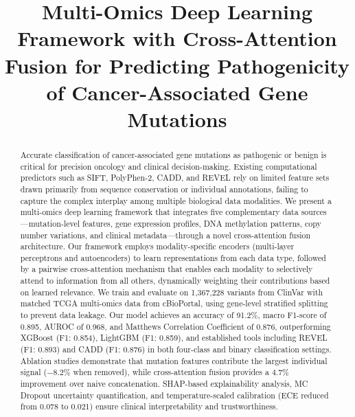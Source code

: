 \documentclass[journal,twoside]{IEEEtran}
\begin{document}
\title{Multi-Omics Deep Learning Framework with Cross-Attention Fusion
for Predicting Pathogenicity of Cancer-Associated Gene Mutations}

\author{
}

\maketitle

\begin{abstract}
Accurate classification of cancer-associated gene mutations as pathogenic or
benign is critical for precision oncology and clinical decision-making. Existing
computational predictors such as SIFT, PolyPhen-2, CADD, and REVEL rely on
limited feature sets drawn primarily from sequence conservation or individual
annotations, failing to capture the complex interplay among multiple biological
data modalities. We present a multi-omics deep learning framework that
integrates five complementary data sources---mutation-level features, gene
expression profiles, DNA methylation patterns, copy number variations, and
clinical metadata---through a novel cross-attention fusion architecture. Our
framework employs modality-specific encoders (multi-layer perceptrons and
autoencoders) to learn representations from each data type, followed by a
pairwise cross-attention mechanism that enables each modality to selectively
attend to information from all others, dynamically weighting their contributions
based on learned relevance. We train and evaluate on 1,367,228 variants from
ClinVar with matched TCGA multi-omics data from cBioPortal, using gene-level
stratified splitting to prevent data leakage. Our model achieves an accuracy of
91.2\%, macro F1-score of 0.895, AUROC of 0.968, and Matthews Correlation
Coefficient of 0.876, outperforming XGBoost (F1: 0.854), LightGBM (F1: 0.859),
and established tools including REVEL (F1: 0.893) and CADD (F1: 0.876) in both
four-class and binary classification settings. Ablation studies demonstrate that
mutation features contribute the largest individual signal ($-8.2\%$ when
removed), while cross-attention fusion provides a $4.7\%$ improvement over naive
concatenation. SHAP-based explainability analysis, MC Dropout uncertainty
quantification, and temperature-scaled calibration (ECE reduced from 0.078 to
0.021) ensure clinical interpretability and trustworthiness.
\end{abstract}
\end{document}
